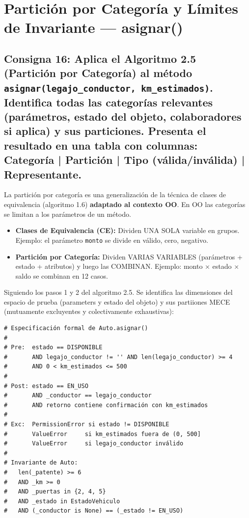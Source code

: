 \section{Partición por Categoría y Límites de Invariante — asignar()}

\subsection{Consigna 16: Aplica el Algoritmo 2.5 (Partición por Categoría) al método \texttt{asignar(legajo\_conductor, km\_estimados)}. Identifica todas las categorías relevantes (parámetros, estado del objeto, colaboradores si aplica) y sus particiones. Presenta el resultado en una tabla con columnas: Categoría | Partición | Tipo (válida/inválida) | Representante.}

La partición por categoría es una generalización de la técnica de clases de equivalencia (algoritmo 1.6) \textbf{adaptado  al contexto OO}. En OO las categorías se limitan a los parámetros de un método.

\begin{itemize}
    \item \textbf{Clases de Equivalencia (CE):} Dividen UNA SOLA variable en grupos. 
          Ejemplo: el parámetro \texttt{monto} se divide en válido, cero, negativo.
    
    \item \textbf{Partición por Categoría:} Dividen VARIAS VARIABLES (parámetros + estado + atributos) 
          y luego las COMBINAN. Ejemplo: monto × estado × saldo se combinan en 12 casos.
\end{itemize}

Siguiendo los pasos 1 y 2 del algoritmo 2.5. Se identifica las dimensiones del espacio de prueba  (parameters y estado del objeto) y sus partiiones MECE (mutuamente excluyentes y colectivamente exhaustivas):

\begin{verbatim}
# Especificación formal de Auto.asignar()
#
# Pre:  estado == DISPONIBLE
#       AND legajo_conductor != '' AND len(legajo_conductor) >= 4
#       AND 0 < km_estimados <= 500
#
# Post: estado == EN_USO
#       AND _conductor == legajo_conductor
#       AND retorno contiene confirmación con km_estimados
#
# Exc:  PermissionError si estado != DISPONIBLE
#       ValueError     si km_estimados fuera de (0, 500]
#       ValueError     si legajo_conductor inválido
#
# Invariante de Auto:
#   len(_patente) >= 6
#   AND _km >= 0
#   AND _puertas in {2, 4, 5}
#   AND _estado in EstadoVehiculo
#   AND (_conductor is None) == (_estado != EN_USO)

\end{verbatim}

